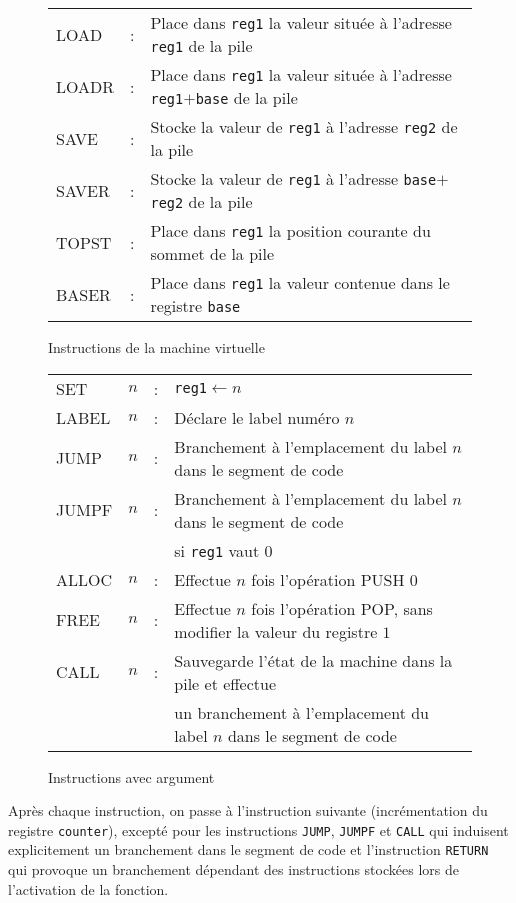 \documentclass[12pt,a4paper]{article}
\begin{document}
\begin{figure}
\begin{tabular}{lll}
    LOAD &:& Place dans {\tt reg1} la valeur située à l'adresse {\tt reg1}
    de la pile\\
    LOADR &:& Place dans {\tt reg1} la valeur située à l'adresse
    {\tt reg1}$+${\tt base} de la pile\\
    SAVE &:& Stocke la valeur de {\tt reg1} à l'adresse {\tt reg2} de la pile\\
    SAVER&:& Stocke la valeur de {\tt reg1} à l'adresse {\tt base}$+${\tt reg2} de la pile\\
    TOPST &:& Place dans {\tt reg1} la position courante du sommet de la pile\\
    BASER &:& Place dans {\tt reg1} la valeur contenue dans le registre {\tt base}\\
  \end{tabular}
  \caption{Instructions de la machine virtuelle}
  \label{fig:instruct}
\end{figure}

\begin{figure}
  \centering
  \begin{tabular}{llll}
    SET   &$n$&:& {\tt reg1}$\leftarrow n$\\
    LABEL &$n$&:& Déclare le label numéro $n$\\
    JUMP  &$n$&:& Branchement à l'emplacement du label $n$ dans le segment de code\\
    JUMPF &$n$&:& Branchement à l'emplacement du label $n$ dans le segment de code\\
    &&& si {\tt reg1} vaut $0$\\
    ALLOC &$n$&:& Effectue $n$ fois l'opération PUSH $0$ \\
    FREE  &$n$&:& Effectue $n$ fois l'opération POP, sans modifier la valeur du registre $1$\\
    CALL  &$n$&:& Sauvegarde l'état de la machine dans la pile et effectue \\
    &&& un branchement à l'emplacement du label $n$ dans le segment de code\\
  \end{tabular}
  \caption{Instructions avec argument}
\label{fig:instructarg}
\end{figure}

Après chaque instruction, on passe à l'instruction suivante
(incrémentation du registre {\tt counter}), excepté
pour les instructions {\tt JUMP}, {\tt JUMPF} et {\tt CALL} qui
induisent explicitement un branchement dans le segment de code
et l'instruction {\tt RETURN} qui provoque un branchement dépendant
des instructions stockées lors de l'activation de la fonction.
\end{document}
